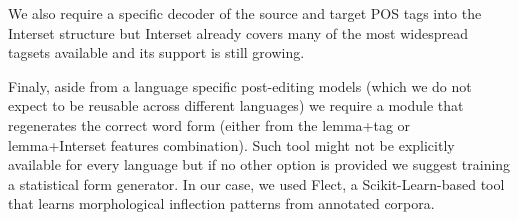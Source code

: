 We also require a specific decoder of the source and target POS tags into the Interset
structure but Interset already covers many of the most widespread tagsets available
and its support is still growing.

Finaly, aside from a language specific post-editing models (which we do not expect
to be reusable across different languages) we require a module that regenerates
the correct word form (either from the lemma+tag or lemma+Interset features combination).
Such tool might not be explicitly available for every language but if no
other option is provided we suggest training a statistical form generator.
In our case, we used Flect, a Scikit-Learn-based
tool that learns morphological inflection patterns from annotated corpora.
